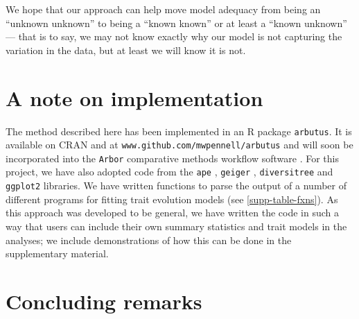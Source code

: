 \documentclass[12pt]{article}
\begin{document}
We hope that our approach can help move model adequacy from being an ``unknown unknown''  to being a ``known known'' or at least a ``known unknown'' --- that is to say, we may not know exactly why our model is not capturing the variation in the data, but at least we will know it is not.


\section*{A note on implementation}

The method described here has been implemented in an R package \texttt{arbutus}. It is available on CRAN and at \texttt{www.github.com/mwpennell/arbutus} and will soon be incorporated into the \texttt{Arbor} comparative methods workflow software \citep{Arbor}. For this project, we have also adopted code from the \texttt{ape} \citep{ape}, \texttt{geiger} \citep{geiger}, \texttt{diversitree} \citep{FitzJohn2012} and \texttt{ggplot2} \citep{ggplot2} libraries. We have written functions to parse the output of a number of different programs for fitting trait evolution models (see \ref{supp-table-fxns}). As this approach was developed to be general, we have written the code in such a way that users can include their own summary statistics and trait models in the analyses; we include demonstrations of how this can be done in the supplementary material.

\section*{Concluding remarks}
\end{document}

